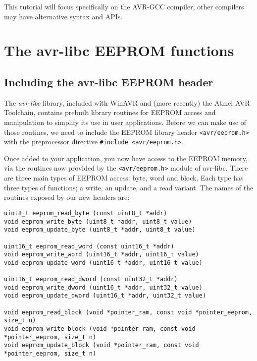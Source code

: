 \documentclass[a4paper,oneside,notitlepage]{book}
\begin{document}
This tutorial will focus specifically on the AVR-GCC compiler; other compilers may have alternative syntax and APIs.


\chapter{The avr-libc EEPROM functions}

\section{Including the avr-libc EEPROM header}

The \textit{avr-libc} library, included with WinAVR and (more recently) the Atmel AVR Toolchain, contains prebuilt library routines for EEPROM access and manipulation to simplify its use in user applications. Before we can make use of those routines, we need to include the EEPROM library header \lstinline{<avr/eeprom.h>} with the preprocessor directive \lstinline{#include <avr/eeprom.h>}.

Once added to your application, you now have access to the EEPROM memory, via the routines now provided by the \lstinline{<avr/eeprom.h>} module of avr-libc. There are three main types of EEPROM access: byte, word and block. Each type has three types of functions; a write, an update, and a read variant. The names of the routines exposed by our new headers are:

\begin{center}
\begin{lstlisting}
uint8_t eeprom_read_byte (const uint8_t *addr)
void eeprom_write_byte (uint8_t *addr, uint8_t value)
void eeprom_update_byte (uint8_t *addr, uint8_t value)

uint16_t eeprom_read_word (const uint16_t *addr)
void eeprom_write_word (uint16_t *addr, uint16_t value)
void eeprom_update_word (uint16_t *addr, uint16_t value)

uint16_t eeprom_read_dword (const uint32_t *addr)
void eeprom_write_dword (uint16_t *addr, uint32_t value)
void eeprom_update_dword (uint16_t *addr, uint32_t value)

void eeprom_read_block (void *pointer_ram, const void *pointer_eeprom, size_t n)
void eeprom_write_block (void *pointer_ram, const void *pointer_eeprom, size_t n)
void eeprom_update_block (void *pointer_ram, const void *pointer_eeprom, size_t n)
\end{lstlisting}
\end{center}
\end{document}
